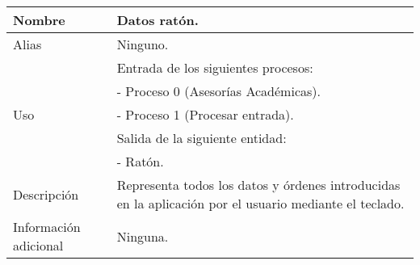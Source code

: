 \begin{center}
  \begin{tabular}{| l | p{9cm} |}
    \hline
    Nombre & \textbf{Datos ratón}.\\
    \hline
    Alias & Ninguno.\\
    \hline
    \multirow{5}{*}{Uso} & Entrada de los siguientes procesos:\\
                         & - Proceso 0 (Asesorías Académicas).\\
                         & - Proceso 1 (Procesar entrada).\\
                         & Salida de la siguiente entidad:\\
                         & - Ratón.\\
    \hline
    Descripción & Representa todos los datos y órdenes introducidas en la
                  aplicación por el usuario mediante el teclado.\\
    \hline
    Información adicional & Ninguna.\\
    \hline
  \end{tabular}
\end{center}

